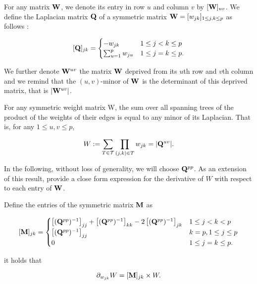 For any matrix ${\bf W}$, we denote its entry in row $u$ and column $v$ by $[{\bf W}]_{uv}$. We define the Laplacian matrix ${\bf Q}$ of a symmetric matrix ${\bf W}=[w_{jk} ]_{1\leq j,k\leq p}$ as follows :
\begin{linenomath*}
\[
 [{\bf Q}]_{jk} =\begin{cases}
    -w_{jk}  & 1\leq j<k \leq p\\
    \sum_{u=1}^p w_{ju} & 1\leq j=k \leq p.
    \end{cases}
\]
\end{linenomath*}
We further denote ${\bf W}^{uv}$ the matrix ${\bf W}$ deprived from its $u$th row and $v$th column and we remind that the $(u, v)$-minor of ${\bf W}$ is the determinant of this deprived matrix, that is $|{\bf W}^{uv}|$.

\begin{theorem} \label{thm:MTT2}
    For any symmetric weight matrix W, the sum over all spanning trees of the product of the weights of their edges is equal to any minor of its Laplacian. That is, for any $1 \leq u, v \leq p$,
   \begin{linenomath*}
   \[
    W := \sum_{T\in\mathcal{T}} \prod_{(j, k)\in T} w_{jk}  = |{\bf Q}^{uv}|.
    \]
    \end{linenomath*}
\end{theorem}    

In the following, without loss of generality, we will choose ${\bf Q}^{pp}$. As an extension of this result, \cite{MeilaJaak} provide a close form expression for the derivative of $W$ with respect to each entry of ${\bf W}$. 

\begin{lemma}  \label{lem:Meila2}
    Define the entries of the symmetric matrix ${\bf M}$ as
\begin{linenomath*}
\[    
 [{\bf M}]_{jk} =\begin{cases}
    \left[({\bf Q}^{pp})^{-1}\right]_{jj} + \left[({\bf Q}^{pp})^{-1}\right]_{kk} -2\left[({\bf Q}^{pp})^{-1}\right]_{jk} & 1\leq j<k < p\\
    \left[({\bf Q}^{pp})^{-1}\right]_{jj} & k=p, 1\leq j \leq p  \\
    0 & 1\leq j=k \leq p.
    \end{cases}
\]
\end{linenomath*}
it holds that
\begin{linenomath*}
$$
\partial_{w_{jk}} W = [{\bf M}]_{jk}  \times W.
$$
\end{linenomath*}
\end{lemma}
